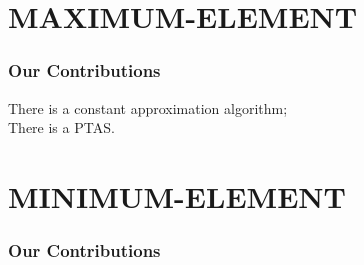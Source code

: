 \documentclass{beamer}
\begin{document}
\section{MAXIMUM-ELEMENT}
\begin{frame}
\frametitle{Our Contributions}
\begin{theorem}
    There is a constant approximation algorithm;\\
    There is a PTAS.
\end{theorem}
\end{frame}

\begin{frame}

\end{frame}

\section{MINIMUM-ELEMENT}
\begin{frame}
\frametitle{Our Contributions}
\begin{theorem}
\end{theorem}
\end{frame}
\end{document}
